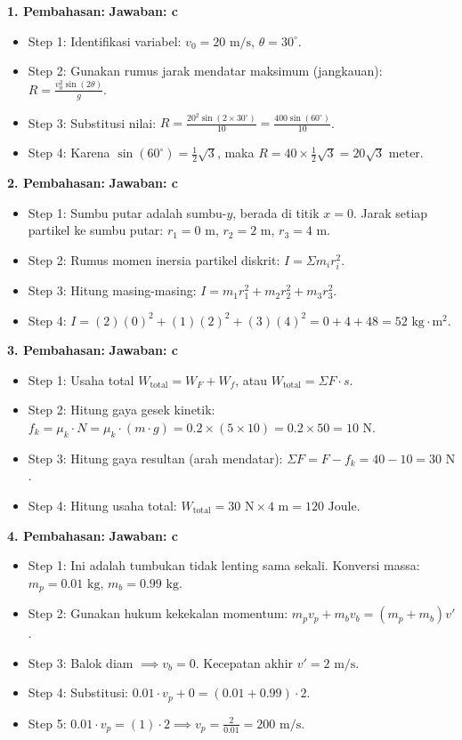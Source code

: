 \documentclass[12pt,a4paper]{article}
\begin{document}
\textbf{1. Pembahasan:} \hfill \textbf{Jawaban: c}
\begin{itemize}
    \item Step 1: Identifikasi variabel: $v_0 = 20 \text{ m/s}$, $\theta = 30^\circ$.
    \item Step 2: Gunakan rumus jarak mendatar maksimum (jangkauan): $R = \frac{v_0^2 \sin(2\theta)}{g}$.
    \item Step 3: Substitusi nilai: $R = \frac{20^2 \sin(2 \times 30^\circ)}{10} = \frac{400 \sin(60^\circ)}{10}$.
    \item Step 4: Karena $\sin(60^\circ) = \frac{1}{2}\sqrt{3}$, maka $R = 40 \times \frac{1}{2}\sqrt{3} = 20\sqrt{3} \text{ meter}$.
\end{itemize}

\textbf{2. Pembahasan:} \hfill \textbf{Jawaban: c}
\begin{itemize}
    \item Step 1: Sumbu putar adalah sumbu-$y$, berada di titik $x = 0$. Jarak setiap partikel ke sumbu putar: $r_1 = 0 \text{ m}$, $r_2 = 2 \text{ m}$, $r_3 = 4 \text{ m}$.
    \item Step 2: Rumus momen inersia partikel diskrit: $I = \Sigma m_i r_i^2$.
    \item Step 3: Hitung masing-masing: $I = m_1 r_1^2 + m_2 r_2^2 + m_3 r_3^2$.
    \item Step 4: $I = (2)(0)^2 + (1)(2)^2 + (3)(4)^2 = 0 + 4 + 48 = 52 \text{ kg}\cdot\text{m}^2$.
\end{itemize}

\textbf{3. Pembahasan:} \hfill \textbf{Jawaban: c}
\begin{itemize}
    \item Step 1: Usaha total $W_{\text{total}} = W_F + W_f$, atau $W_{\text{total}} = \Sigma F \cdot s$.
    \item Step 2: Hitung gaya gesek kinetik: $f_k = \mu_k \cdot N = \mu_k \cdot (m \cdot g) = 0.2 \times (5 \times 10) = 0.2 \times 50 = 10 \text{ N}$.
    \item Step 3: Hitung gaya resultan (arah mendatar): $\Sigma F = F - f_k = 40 - 10 = 30 \text{ N}$.
    \item Step 4: Hitung usaha total: $W_{\text{total}} = 30 \text{ N} \times 4 \text{ m} = 120 \text{ Joule}$.
\end{itemize}

\textbf{4. Pembahasan:} \hfill \textbf{Jawaban: c}
\begin{itemize}
    \item Step 1: Ini adalah tumbukan tidak lenting sama sekali. Konversi massa: $m_p = 0.01 \text{ kg}$, $m_b = 0.99 \text{ kg}$.
    \item Step 2: Gunakan hukum kekekalan momentum: $m_p v_p + m_b v_b = (m_p + m_b)v'$.
    \item Step 3: Balok diam $\implies v_b = 0$. Kecepatan akhir $v' = 2 \text{ m/s}$.
    \item Step 4: Substitusi: $0.01 \cdot v_p + 0 = (0.01 + 0.99) \cdot 2$.
    \item Step 5: $0.01 \cdot v_p = (1) \cdot 2 \implies v_p = \frac{2}{0.01} = 200 \text{ m/s}$.
\end{itemize}
\end{document}
